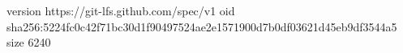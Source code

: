version https://git-lfs.github.com/spec/v1
oid sha256:5224fc0c42f71bc30d1f90497524ae2e1571900d7b0df03621d45eb9df3544a5
size 6240
